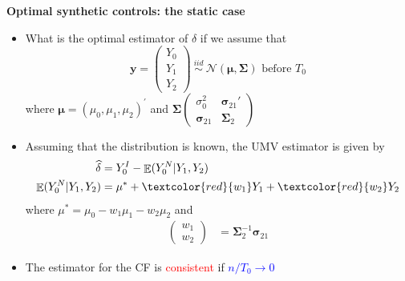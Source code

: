 \documentclass{beamer}
\def\E{\mathop{\mathbb{E}}\limits}
\newcommand{\blue}[1]{\textcolor{blue}{#1}}
\newcommand{\red}[1]{\textcolor{red}{#1}}
\begin{document}
\begin{frame}{\bf Optimal synthetic controls: the static case}

\begin{itemize}
\item What is the optimal estimator of $\delta$ if we assume that
\[
\boldsymbol{y} = \begin{pmatrix} Y_0 \\ Y_1\\ Y_2 \end{pmatrix} \ \stackrel{iid}{\sim} \ \mathcal{N}(\boldsymbol{\mu},\boldsymbol{\Sigma})
\text{ before } T_0
\]
where $\boldsymbol{\mu} = \left(\mu_0, \mu_1, \mu_2  \right)^\prime$ and $\boldsymbol{\Sigma}\begin{pmatrix} \sigma_0^2 & \boldsymbol{\sigma}_{21}' \\ \boldsymbol{\sigma}_{21} & \boldsymbol{\Sigma}_2 \end{pmatrix}$
\item Assuming that the distribution is known, the UMV estimator is given by
{\small \begin{align*}
\widehat \delta &=  Y_0^I - \E(Y_0^N|Y_1,Y_2) \\
\E(Y_0^N|Y_1,Y_2)  &= \mu^* + \red{w_1} Y_1 + \red{w_2} Y_2
\end{align*} }
where $\mu^*=\mu_0 - w_1\mu_1 - w_2\mu_2$ and
\begin{align*}
\begin{pmatrix} w_1 \\ w_2 \end{pmatrix} &= \boldsymbol{\Sigma}_2^{-1} \boldsymbol{\sigma}_{21}
\end{align*}
\item The estimator for the CF is \red{consistent} if \blue{$n/T_0 \to 0$}
\end{itemize}
\end{frame}
\end{document}
